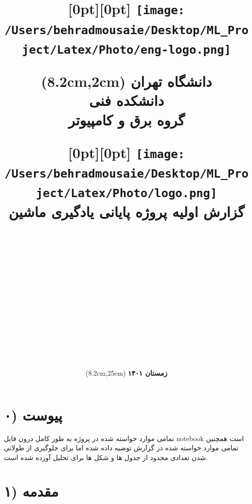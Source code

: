 \documentclass{article}
\title{\raisebox{-5mm}[0pt][0pt]{
	\texttt{[image: /Users/behradmousaie/Desktop/ML\_Project/Latex/Photo/eng-logo.png]}\hspace*{-20cm} }
	\begin{textblock*}{5cm}(8.2cm,2cm)  
		\textbf{دانشگاه تهران\\
			دانشکده فنی \\
		گروه برق و کامپیوتر}
	\end{textblock*}
\raisebox{-10mm}[0pt][0pt]{
	\texttt{[image: /Users/behradmousaie/Desktop/ML\_Project/Latex/Photo/logo.png]}\hspace*{0cm} }\\
	\vspace{1in}
	\textmd{\textbf{\Huge{گزارش اولیه پروژه پایانی یادگیری ماشین}}}\\
	\normalsize\vspace{0.5in}\small{\hmwkDueDate\ }\\
	\vspace{0.5in}\large{\textit{\hmwkClassInstructor\ \\ \hmwkClassTime \\ \hmwkClassTimea \\ \hmwkClassTimeb}}
	\vspace{1.2in}
}
\author{\hmwkAuthorNamea \\ \hmwkAuthorNameb \\ \hmwkAuthorName \\ \hmwkAuthorNamec \\ \hmwkAuthorNamed \\ 
	\begin{textblock*}{5cm}(8.2cm,25cm)  
	\textbf{زمستان ۱۴۰۱}
\end{textblock*}
}
\date{}
\begin{document}
		\large
    	\maketitle
	\pagebreak
	
	\tableofcontents
	\newpage
	
	\listoffigures
	\newpage
\section{۰) پیوست}
تمامی موارد خواسته شده در پروژه به طور کامل درون فایل notebook است همچنین تمامی موارد خواسته شده در گزارش توضیه داده شده اما برای جلوگیری از طولانی شدن تعدادی محدود از جدول ها و شکل ها برای تحلیل آورده شده است.
\section{۱) مقدمه}
\end{document}
